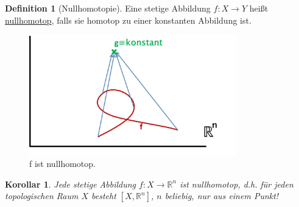 \documentclass[a4paper,11pt,notitlepage]{report}
\newtheorem{corollary}{Korollar}[chapter]
\theoremstyle{remark}
\theoremstyle{definition}
\newtheorem{definition}{Definition}[chapter]
\newcommand{\R}{{\ensuremath{\mathbb{R}}}}
\begin{document}
\begin{definition}[Nullhomotopie]
Eine stetige Abbildung $f \colon X \rightarrow Y$ heißt \underline{nullhomotop}, falls sie homotop zu einer konstanten Abbildung ist.
\end{definition}

\begin{figure}[h]
\centering
\includegraphics[width=0.8\textwidth]{images/Nullhomotopie.jpg}
\caption{f ist nullhomotop.}
\end{figure}

\begin{corollary}
Jede stetige Abbildung $f \colon X \rightarrow \R^n$ ist nullhomotop, d.h. für jeden topologischen Raum $X$ besteht $[X, \R^n]$, $n$ beliebig, nur aus einem Punkt!
\end{corollary}
\end{document}
